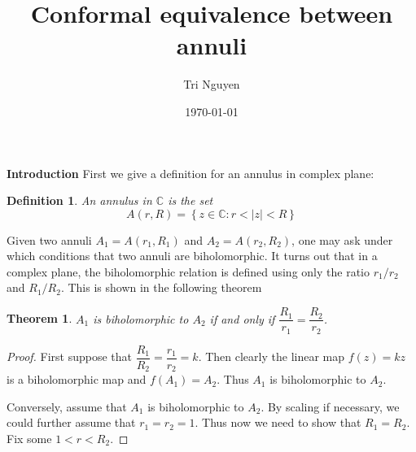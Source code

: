 \documentclass{article} %
\title{Conformal equivalence between annuli} %
\author{Tri Nguyen} %
\date{\today} %
\newtheorem{theorem}{Theorem}
\newtheorem{definition}{Definition}
\begin{document}
\maketitle %
\noindent \textbf{Introduction}
First we give a definition for an annulus in complex plane:
\begin{definition}
  An annulus in $\mathbb{C}$ is the set
  \[A(r,R) = \left\lbrace z \in \mathbb{C}: r < |z| <R \right\rbrace\]
\end{definition}
Given two annuli $A_1 = A(r_1, R_1)$ and $A_2 = A(r_2, R_2)$, one may ask under which conditions
that two annuli are biholomorphic. It turns out that in a complex plane, the biholomorphic relation is defined using only
the ratio $r_1/r_2$ and $R_1/R_2$. This is shown in the following theorem

\begin{theorem}
  $A_1$ is biholomorphic to $A_2$ if and only if $\dfrac{R_1}{r_1} = \dfrac{R_2}{r_2}$.
\end{theorem}
\begin{proof}
  First suppose that $\dfrac{R_1}{R_2} = \dfrac{r_1}{r_2} =k$. Then clearly the linear map $f(z)=kz$
  is a biholomorphic map and $f(A_1) = A_2$. Thus $A_1$ is biholomorphic to $A_2$.

  Conversely, assume that $A_1$ is biholomorphic to $A_2$. By scaling if necessary, we could
  further assume that $r_1=r_2=1$. Thus now we need to show that $R_1=R_2$. Fix some $1<r<R_2$.

\end{proof}
\end{document}
